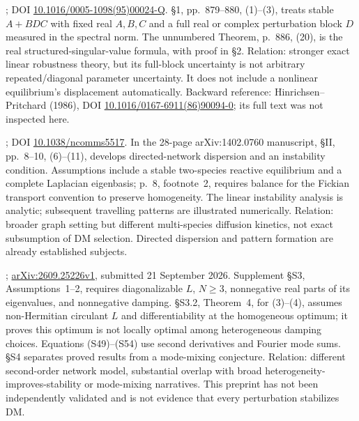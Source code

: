 \begin{description}[style=nextline,leftmargin=0pt,labelwidth=0pt,labelsep=0pt]
\item[S21: Qiu et al. (1995).]
\cite{QiuEtAl1995}; DOI
\href{https://doi.org/10.1016/0005-1098(95)00024-Q}{10.1016/0005-1098(95)00024-Q}.
\S1, pp.~879--880, (1)--(3), treats stable $A+BDC$ with fixed
real $A,B,C$ and a full real or complex perturbation block $D$ measured
in the spectral norm. The unnumbered Theorem, p.~886, (20), is the
real structured-singular-value formula, with proof in \S2.
Relation: stronger exact linear robustness theory, but its full-block
uncertainty is not arbitrary repeated/diagonal parameter uncertainty.
It does not include a nonlinear equilibrium's displacement automatically.
Backward reference: Hinrichsen--Pritchard (1986), DOI
\href{https://doi.org/10.1016/0167-6911(86)90094-0}{10.1016/0167-6911(86)90094-0};
its full text was not inspected here.

\item[S23: Asllani et al. (2014).]
\cite{AsllaniEtAl2014}; DOI
\href{https://doi.org/10.1038/ncomms5517}{10.1038/ncomms5517}.
In the 28-page arXiv:1402.0760 manuscript, \S II,
pp.~8--10, (6)--(11), develops directed-network dispersion and an
instability condition. Assumptions include a stable two-species reactive
equilibrium and a complete Laplacian eigenbasis; p.~8, footnote~2,
requires balance for the Fickian transport convention to preserve
homogeneity. The linear instability analysis is analytic; subsequent
travelling patterns are illustrated numerically. Relation: broader graph
setting but different multi-species diffusion kinetics, not exact
subsumption of DM selection. Directed dispersion and pattern formation
are already established subjects.

\item[S24: Montanari, Zanin and Motter (2026): recent priority warning.]
\cite{MontanariZaninMotter2026};
\href{https://arxiv.org/html/2609.25226v1}{arXiv:2609.25226v1},
submitted 21 September 2026. Supplement \S S3, Assumptions~1--2,
requires diagonalizable $L$, $N\geq3$, nonnegative real parts of its
eigenvalues, and nonnegative damping. \S S3.2, Theorem~4,
for (3)--(4), assumes non-Hermitian circulant $L$ and differentiability
at the homogeneous optimum; it proves this optimum is not locally
optimal among heterogeneous damping choices. Equations (S49)--(S54)
use second derivatives and Fourier mode sums. \S S4 separates proved
results from a mode-mixing conjecture. Relation: different second-order
network model, substantial overlap with broad heterogeneity-improves-stability
or mode-mixing narratives. This preprint has not been independently
validated and is not evidence that every perturbation stabilizes DM.
\end{description}

